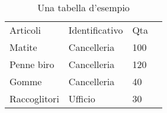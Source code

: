 \begin{table}[h!]
\centering
\begin{tabular}{llll}
Articoli      & Identificativo & Qta \\
Matite        & Cancelleria    & 100 \\
Penne biro    & Cancelleria    & 120 \\
Gomme         & Cancelleria    & 40  \\
Raccoglitori  & Ufficio        & 30  \\
\end{tabular}
\caption{Una tabella d'esempio}
\end{table}
